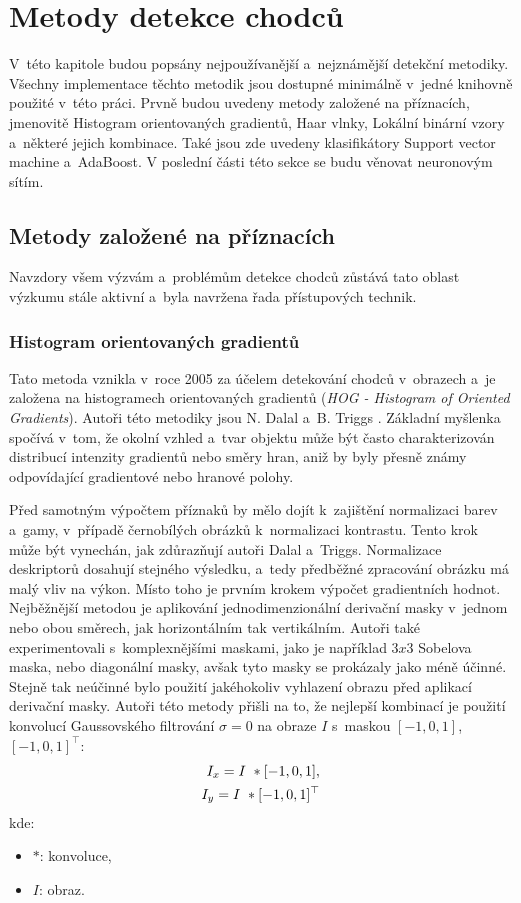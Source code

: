 \section{Metody detekce chodců}
V~této kapitole budou popsány nejpoužívanější a~nejznámější detekční metodiky. Všechny implementace těchto metodik jsou dostupné minimálně v~jedné knihovně použité v~této práci. Prvně budou uvedeny metody založené na příznacích, jmenovitě Histogram orientovaných gradientů, Haar vlnky, Lokální binární vzory a~některé jejich kombinace. Také jsou zde uvedeny klasifikátory Support vector machine a~AdaBoost. V poslední části této sekce se budu věnovat neuronovým sítím. 

\subsection{Metody založené na příznacích}
Navzdory všem výzvám a~problémům detekce chodců zůstává tato oblast výzkumu stále aktivní a~byla navržena řada přístupových technik.
\subsubsection*{Histogram orientovaných gradientů}
Tato metoda vznikla v~roce 2005 za účelem detekování chodců v~obrazech a~je založena na histogramech orientovaných gradientů (\textit{HOG - Histogram of Oriented Gradients}). Autoři této metodiky jsou N. Dalal a~B. Triggs \cite{hog:dalal}. Základní myšlenka spočívá v~tom, že okolní vzhled a~tvar objektu může být často charakterizován distribucí intenzity gradientů nebo směry hran, aniž by byly přesně známy odpovídající gradientové nebo hranové polohy.  

Před samotným výpočtem příznaků by mělo dojít k~zajištění normalizaci barev a~gamy, v~případě černobílých obrázků k~normalizaci kontrastu. Tento krok může být vynechán, jak zdůrazňují autoři Dalal a~Triggs. Normalizace deskriptorů dosahují stejného výsledku, a~tedy předběžné zpracování obrázku má malý vliv na výkon. Místo toho je prvním krokem výpočet gradientních hodnot. Nejběžnější metodou je aplikování jednodimenzionální derivační masky v~jednom nebo obou směrech, jak horizontálním tak vertikálním. Autoři také experimentovali s~komplexnějšími maskami, jako je například $3x3$ Sobelova maska, nebo diagonální masky, avšak tyto masky se prokázaly jako méně účinné. Stejně tak neúčinné bylo použití jakéhokoliv vyhlazení obrazu před aplikací derivační masky. Autoři této metody přišli na to, že nejlepší kombinací je použití konvolucí Gaussovského filtrování $\sigma = 0$ na obraze $I$ s~maskou $[-1, 0, 1]$, $[-1,0,1]^\top$:
\begin{equation*}
\centering
 \label{eq:hogMask}
 \begin{aligned}
I_x = I~* [-1, 0, 1], \\
I_y = I~* [-1, 0, 1]^\top
 \end{aligned}
\end{equation*}
kde:
\begin{itemize}[label=]
  \item $*$: konvoluce,
  \item $I$: obraz.
\end{itemize}


